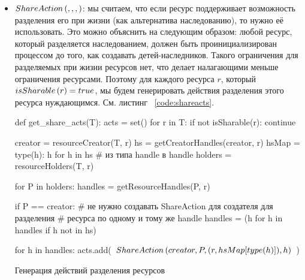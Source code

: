 \begin{itemize}
	\item $ShareAction\left( , , ,  \right)$: мы считаем, что если ресурс поддерживает возможность разделения его при жизни (как альтернатива наследованию), то нужно её использовать. Это можно объяснить на следующим образом: любой ресурс, который разделяется наследованием, должен быть проинициализирован процессом до того, как создавать детей-наследников. Такого ограничения для разделяемых при жизни ресурсов нет, что делает налагающими меньше ограничения ресурсами. Поэтому для каждого ресурса $r$, который $isSharable\left( r \right) = true$, мы будем генерировать действия разделения этого ресурса нуждающимся. См. листинг ~\ref{code:shareacts}.

\begin{listing}[ht!]
\begin{pythoncode}
def get_share_acts(T):
    acts = set()
    for r in T:
        if not isSharable(r):
            continue

        creator = resourceCreator(T, r)
        hs = getCreatorHandles(creator, r)
        hsMap = {type(h): h for h in hs}  # из типа handle в handle
        holders = resourceHolders(T, r)

        for P in holders:
            handles = getResourceHandles(P, r)

            if P == creator:
                # не нужно создавать ShareAction для создателя для разделения
                # ресурса по одному и тому же handle
                handles = (h for h in handles if h not in hs)
            
            for h in handles:
                 acts.add(~$\crshare{creator}{P}{(r, hsMap[type(h)])}{h}$~)


\end{pythoncode}
\caption{Генерация действий разделения ресурсов}
\label{code:shareacts}
\end{listing}

\end{itemize}

